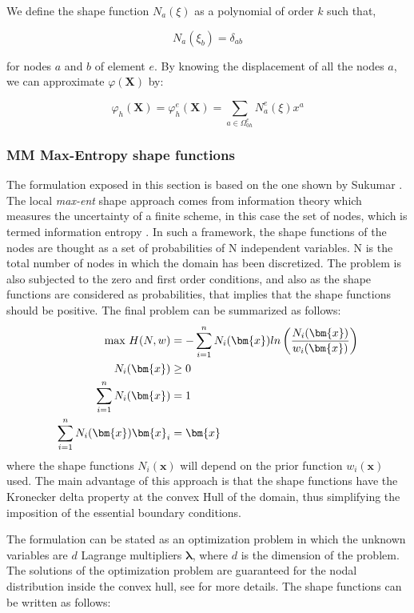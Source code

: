 \documentclass[oneside,11pt,times]{book}
\begin{document}
We define the shape function $N_a(\xi)$ as a polynomial of order $k$ such that,

\begin{equation}
    N_a(\xi_b)=\delta_{ab}
    \label{eq:ShapeFEM}
\end{equation}

for nodes $a$ and $b$ of element $e$.
By knowing the displacement of all the
nodes $a$, we can approximate $\varphi(\bm{X})$ by:

\begin{equation}
    \varphi_h(\bm{X})= \varphi_h^e(\bm{X})=\sum_{a \in \Omega_{0h}^e} N_a^e(\xi) x^a
    \label{eq:phiX}
\end{equation}

\subsubsection{MM Max-Entropy shape functions}
The formulation exposed in this section is based on the one shown by Sukumar \cite{sukumar:2007}.  The local \textit{max-ent} shape approach comes from information theory which measures the uncertainty of a finite scheme, in this case the set of nodes, which is termed information entropy \citep{ullah:2013}. In such a framework, the shape functions of the nodes are thought as a set of probabilities of N independent variables. N is the total number of nodes in which the domain has been discretized. The problem is also subjected to the zero and first order conditions, and also as the shape functions are considered as probabilities, that implies that the shape functions should be positive. The final problem can be summarized as follows:
\begin{equation}
\begin{aligned}\label{eq:4}
\centering
\text{max } H(N,w)&=-\sum_{i=1}^nN_i(\bm{x})ln\left(\frac{N_i(\bm{x})}{w_i(\bm{x})}\right)\\
N_i (\bm{x})&\ge 0\\
\sum_{i=1}^nN_i(\bm{x})&=1\\
\sum_{i=1}^nN_i(\bm{x})\bm{x}_i&=\bm{x}
\end{aligned}
\end{equation}
where the shape functions $N_i(\bm{x})$ will depend on the prior function $w_i(\bm{x})$ used. The main advantage of this approach is that the shape functions have the Kronecker delta property at the convex Hull of the domain, thus simplifying the imposition of the essential boundary conditions.

The formulation can be stated as an optimization problem in which the unknown variables are $d$ Lagrange multipliers $\bm{\lambda}$, where $d$ is the dimension of the problem. The solutions of the optimization problem are guaranteed for the nodal distribution inside the convex hull, see \cite{arroyo:2006} for more details. The shape functions can be written as follows:
\end{document}
